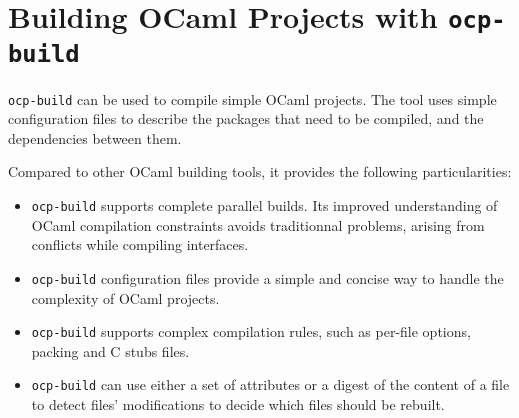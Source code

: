 
\chapter{Building OCaml Projects with {\tt ocp-build}}

{\tt ocp-build} can be used to compile simple OCaml projects.
The tool uses simple configuration files to describe the
packages that need to be compiled, and the dependencies between
them.

Compared to other OCaml building tools, it provides the following
particularities:
\begin{itemize}
\item {\tt ocp-build} supports complete parallel builds. Its improved
  understanding of OCaml compilation constraints avoids traditionnal
  problems, arising from conflicts while compiling interfaces.
\item {\tt ocp-build} configuration files provide a simple and concise
  way to handle the complexity of OCaml projects.
\item {\tt ocp-build} supports complex compilation rules, such as
  per-file options, packing and C stubs files.
\item {\tt ocp-build} can use either a set of attributes or a digest
  of the content of a file to detect files' modifications to decide
  which files should be rebuilt.
\end{itemize}

